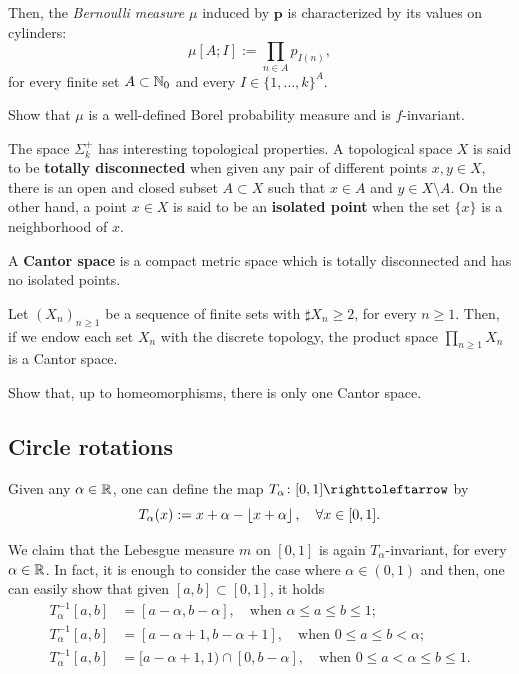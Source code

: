 Then, the \emph{Bernoulli measure $\mu$} induced by $\boldsymbol{p}$ is characterized by its values on cylinders:
\begin{displaymath}
  \mu[A;I]:=\prod_{n\in A} p_{I(n)},
\end{displaymath}
for every finite set $A\subset\mathbb{N}_0$ and every $I\in \{1,\ldots,k\}^A$.

\begin{exercise}
  Show that $\mu$ is a well-defined Borel probability measure and is $f$-invariant.
\end{exercise}

The space $\Sigma_k^+$ has interesting topological properties. A topological space $X$ is said to be \textbf{totally disconnected} when given any pair of different points $x,y\in X$, there is an open and closed subset $A\subset X$ such that $x\in A$ and $y\in X\setminus A$. On the other hand, a point $x\in X$ is said to be an \textbf{isolated point} when the set $\{x\}$ is a neighborhood of $x$.

A \textbf{Cantor space} is a compact metric space which is totally disconnected and has no isolated points.

\begin{exercise}\label{exer:Cantor-space-construction}
  Let $(X_n)_{n\geq 1}$ be a sequence of finite sets with $\sharp X_n\geq 2$, for every $n\geq 1$. Then, if we endow each set $X_n$ with the discrete topology, the product space $\prod_{n\geq 1} X_n$ is a Cantor space.
\end{exercise}

\begin{exercise}\label{exer:Cantor-spaces-uniqueness}
  Show that, up to homeomorphisms, there is only one Cantor space.
\end{exercise}



\subsection{Circle rotations}\label{sec:circle-rotations}

Given any $\alpha\in\mathbb{R}$, one can define the map $T_{\alpha}\colon [0,1]\carr$ by
\begin{displaymath}
  T_{\alpha}(x):=x+\alpha - \left\lfloor{x+\alpha}\right\rfloor, \quad\forall x\in [0,1].
\end{displaymath}

We claim that the Lebesgue measure $m$ on $[0,1]$ is again $T_{\alpha}$-invariant, for every $\alpha\in\mathbb{R}$. In fact, it is enough to consider the case where $\alpha\in (0,1)$ and then, one can easily show that given $[a,b]\subset [0,1]$, it holds
\begin{align*}
  T_{\alpha}^{-1}[a,b]&=[a-\alpha, b-\alpha],\quad \text{when } \alpha\leq a\leq b\leq 1;\\
  T_{\alpha}^{-1}[a,b]&=[a-\alpha+1,b-\alpha+1], \quad\text{when } 0\leq a\leq b<\alpha;\\
 T_{\alpha}^{-1}[a,b]&=[a-\alpha+1,1)\cap [0,b-\alpha], \quad\text{when } 0\leq a<\alpha\leq b\leq 1.
\end{align*}

